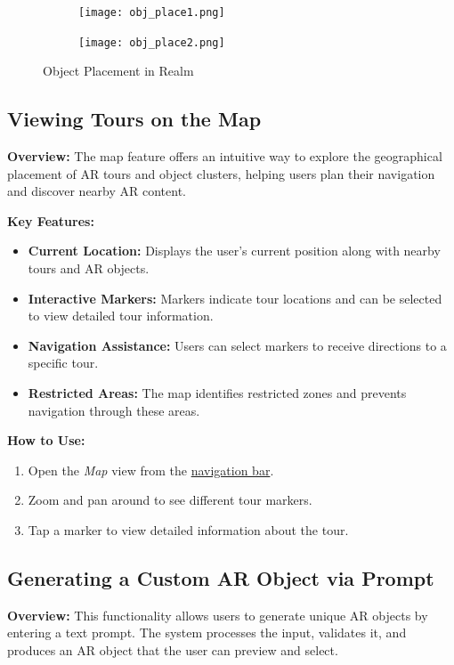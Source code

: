 \documentclass[12pt, titlepage]{article}
\newcommand{\progname}{Realm}
\begin{document}
\newpage
\begin{figure}[ht!]
    \centering
    \begin{subfigure}[b]{0.48\textwidth}
        \centering
        \texttt{[image: obj\_place1.png]}
    \end{subfigure}
    \hfill
    \begin{subfigure}[b]{0.48\textwidth}
        \centering
        \texttt{[image: obj\_place2.png]}
    \end{subfigure}
    \caption{Object Placement in \progname{}}
    \label{fig:obj_place}
\end{figure}

\clearpage
\subsection{Viewing Tours on the Map}
\textbf{Overview:} The map feature offers an intuitive way to explore the geographical placement of AR tours and object clusters, helping users plan their navigation and discover nearby AR content.

\textbf{Key Features:}
\begin{itemize}[leftmargin=*]
    \item \textbf{Current Location:} Displays the user's current position along with nearby tours and AR objects.
    \item \textbf{Interactive Markers:} Markers indicate tour locations and can be selected to view detailed tour information.
    \item \textbf{Navigation Assistance:} Users can select markers to receive directions to a specific tour.
    \item \textbf{Restricted Areas:} The map identifies restricted zones and prevents navigation through these areas.
\end{itemize}

\textbf{How to Use:}
\begin{enumerate}[leftmargin=*]
    \item Open the \emph{Map} view from the \hyperref[fig:nav_bar]{navigation bar}.
    \item Zoom and pan around to see different tour markers.
    \item Tap a marker to view detailed information about the tour.
\end{enumerate}

\subsection{Generating a Custom AR Object via Prompt}
\textbf{Overview:} This functionality allows users to generate unique AR objects by entering a text prompt. The system processes the input, validates it, and produces an AR object that the user can preview and select.
\end{document}
